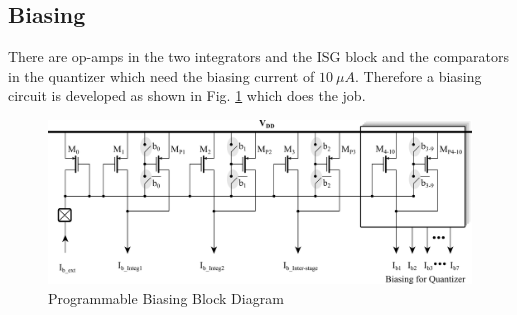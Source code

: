 \subsection{Biasing}
There are op-amps in the two integrators and the ISG block and the comparators in the quantizer which need the biasing current of $10~\mu A$. Therefore a biasing circuit is developed as shown in Fig. \ref{fig:bias} which does the job.
%
\begin{figure}[h!]
\centering
\includegraphics[width=\columnwidth]{Chap05/Figures/biasing_block.png}
\caption{Programmable Biasing Block Diagram}
\label{fig:bias}
\end{figure}
%
%
